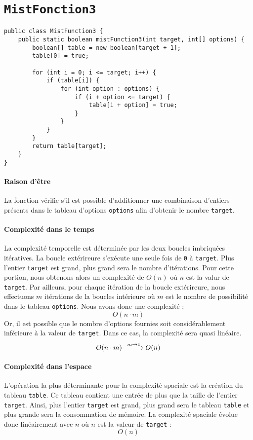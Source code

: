\documentclass[9pt]{report}
\DeclareRobustCommand{\looongrightarrow}{%
  \DOTSB\relbar\joinrel\relbar\joinrel\relbar\joinrel\rightarrow
}
\begin{document}
  \section{\texttt{MistFonction3}}
  \begin{lstlisting}[style=JavaDraculaWhite]
 public class MistFunction3 {
    public static boolean mistFunction3(int target, int[] options) {
        boolean[] table = new boolean[target + 1];
        table[0] = true;

        for (int i = 0; i <= target; i++) {
            if (table[i]) {
                for (int option : options) {
                    if (i + option <= target) {
                        table[i + option] = true;
                    }
                }
            }
        }
        return table[target];
    }
}    
  \end{lstlisting}


  \paragraph{Raison d'être}
  La fonction vérifie s'il est possible d'additionner une combinaison 
  d'entiers présents 
  dans le tableau d'options \texttt{options} afin d'obtenir le nombre 
  \texttt{target}.


  \paragraph{Complexité dans le temps}
  La complexité temporelle est déterminée par les deux boucles imbriquées 
  itératives. La boucle extérireure s'exécute une seule fois de 
  \texttt{0} à \texttt{target}. Plus l'entier \texttt{target} est grand, 
  plus grand sera le nombre d'itérations. Pour cette portion, nous obtenons alors 
  un complexité de $O(n)$ où $n$ est la valur de \texttt{target}. Par ailleurs, 
  pour chaque itération de la boucle extérireure, nous effectuons $m$ itérations 
  de la boucles intérieure où $m$ est le nombre de possibilité dans le 
  tableau \texttt{options}. Nous avons donc une complexité :
           \[ O( n \cdot m)\]
  Or, il est possible que le nombre d'options fournies soit considérablement 
  inférieure à la valeur de \texttt{target}. Dans ce cas, la complexité         
  sera quasi linéaire.  
          \[O(n \cdot m) \stackrel{m \to 1}{\looongrightarrow} O(n) \]


  \paragraph{Complexité dans l'espace}
  L'opération la plus déterminante pour la complexité spaciale est la création 
  du tableau \texttt{table}. Ce tableau contient une entrée de plus que la taille de l'entier 
  \texttt{target}. Ainsi, plus l'entier \texttt{target} est grand, plus grand 
  sera le tableau \texttt{table} et plus grande sera la consommation de mémoire. 
  La complexité spaciale évolue donc linéairement avec $n$ où $n$ est la 
  valeur de \texttt{target} :
  \[ O(n) \]
\end{document}
